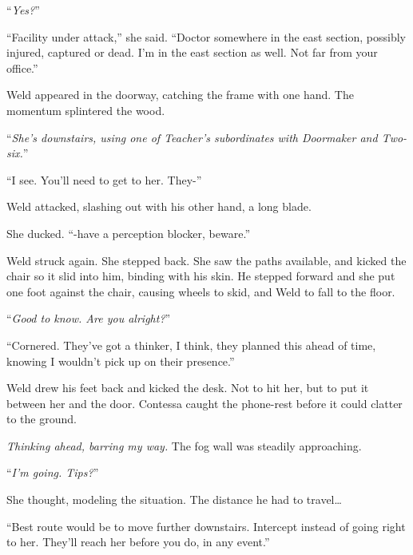``\emph{Yes?}''



``Facility under attack,'' she said.  ``Doctor somewhere in the east section, possibly injured, captured or dead.  I'm in the east section as well.  Not far from your office.''



Weld appeared in the doorway, catching the frame with one hand.  The momentum splintered the wood.



``\emph{She's downstairs, using one of Teacher's subordinates with Doormaker and Two-six.}''



``I see.  You'll need to get to her.  They-''



Weld attacked, slashing out with his other hand, a long blade.



She ducked.  ``-have a perception blocker, beware.''



Weld struck again.  She stepped back.  She saw the paths available, and kicked the chair so it slid into him, binding with his skin.  He stepped forward and she put one foot against the chair, causing wheels to skid, and Weld to fall to the floor.



``\emph{Good to know.  Are you alright?}''



``Cornered.  They've got a thinker, I think, they planned this ahead of time, knowing I wouldn't pick up on their presence.''



Weld drew his feet back and kicked the desk.  Not to hit her, but to put it between her and the door.  Contessa caught the phone-rest before it could clatter to the ground.



\emph{Thinking ahead, barring my way.  }The fog wall was steadily approaching.



``\emph{I'm going.  Tips?}''



She thought, modeling the situation.  The distance he had to travel\ldots



``Best route would be to move further downstairs.  Intercept instead of going right to her.  They'll reach her before you do, in any event.''



